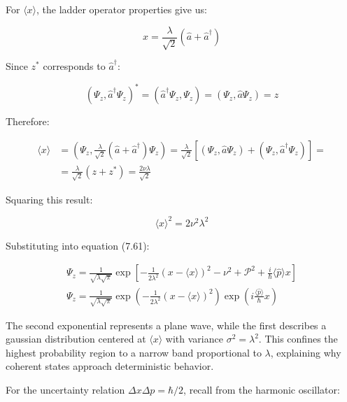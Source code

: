\documentclass[10pt]{article}
\begin{document}
For $\langle x\rangle$, the ladder operator properties give us:

\begin{equation*}
x=\frac{\lambda}{\sqrt{2}}\left(\hat{a}+\hat{a}^{\dagger}\right) \tag{7.62}
\end{equation*}

Since $z^{*}$ corresponds to $\hat{a}^{\dagger}$:

\begin{equation*}
\left(\Psi_{z}, \hat{a}^{\dagger} \Psi_{z}\right)^{*}=\left(\hat{a}^{\dagger} \Psi_{z}, \Psi_{z}\right)=\left(\Psi_{z}, \hat{a} \Psi_{z}\right)=z \tag{7.63}
\end{equation*}

Therefore:

\begin{align*}
\langle x\rangle & =\left(\Psi_{z}, \frac{\lambda}{\sqrt{2}}\left(\hat{a}+\hat{a}^{\dagger}\right) \Psi_{z}\right)=\frac{\lambda}{\sqrt{2}}\left[\left(\Psi_{z}, \hat{a} \Psi_{z}\right)+\left(\Psi_{z}, \hat{a}^{\dagger} \Psi_{z}\right)\right]=  \tag{7.64}\\
& =\frac{\lambda}{\sqrt{2}}\left(z+z^{*}\right)=\frac{2 \nu \lambda}{\sqrt{2}}
\end{align*}

Squaring this result:

\begin{equation*}
\langle x\rangle^{2}=2 \nu^{2} \lambda^{2} \tag{7.65}
\end{equation*}

Substituting into equation (7.61):

\begin{gather*}
\Psi_{z}=\frac{1}{\sqrt{\lambda \sqrt{\pi}}} \exp \left[-\frac{1}{2 \lambda^{2}}(x-\langle x\rangle)^{2}-\mathcal{\nu}^{2}+\mathcal{P}^{2}+\frac{i}{\hbar}\langle\hat{p}\rangle x\right]  \tag{7.66}\\
\Psi_{z}=\frac{1}{\sqrt{\lambda \sqrt{\pi}}} \exp \left(-\frac{1}{2 \lambda^{2}}(x-\langle x\rangle)^{2}\right) \exp \left(i \frac{\langle\hat{p}\rangle}{\hbar} x\right) \tag{7.67}
\end{gather*}

The second exponential represents a plane wave, while the first describes a gaussian distribution centered at $\langle x\rangle$ with variance $\sigma^{2}=\lambda^{2}$. This confines the highest probability region to a narrow band proportional to $\lambda$, explaining why coherent states approach deterministic behavior.

For the uncertainty relation $\Delta x \Delta p=\hbar / 2$, recall from the harmonic oscillator:
\end{document}
